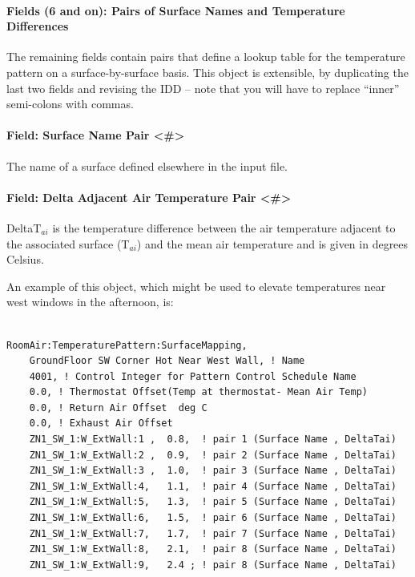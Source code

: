 \paragraph{Fields (6 and on): Pairs of Surface Names and Temperature Differences}\label{fields-6-and-on-pairs-of-surface-names-and-temperature-differences}

The remaining fields contain pairs that define a lookup table for the temperature pattern on a surface-by-surface basis. This object is extensible, by duplicating the last two fields and revising the IDD -- note that you will have to replace ``inner'' semi-colons with commas.

\paragraph{Field: Surface Name Pair \textless{}\#\textgreater{}}\label{field-surface-name-pair}

The name of a surface defined elsewhere in the input file.

\paragraph{Field: Delta Adjacent Air Temperature Pair \textless{}\#\textgreater{}}\label{field-delta-adjacent-air-temperature-pair}

DeltaT\(_{ai}\) is the temperature difference between the air temperature adjacent to the associated surface (T\(_{ai}\)) and the mean air temperature and is given in degrees Celsius.

An example of this object, which might be used to elevate temperatures near west windows in the afternoon, is:

\begin{lstlisting}

RoomAir:TemperaturePattern:SurfaceMapping,
    GroundFloor SW Corner Hot Near West Wall, ! Name
    4001, ! Control Integer for Pattern Control Schedule Name
    0.0, ! Thermostat Offset(Temp at thermostat- Mean Air Temp)
    0.0, ! Return Air Offset  deg C
    0.0, ! Exhaust Air Offset
    ZN1_SW_1:W_ExtWall:1 ,  0.8,  ! pair 1 (Surface Name , DeltaTai)
    ZN1_SW_1:W_ExtWall:2 ,  0.9,  ! pair 2 (Surface Name , DeltaTai)
    ZN1_SW_1:W_ExtWall:3 ,  1.0,  ! pair 3 (Surface Name , DeltaTai)
    ZN1_SW_1:W_ExtWall:4,   1.1,  ! pair 4 (Surface Name , DeltaTai)
    ZN1_SW_1:W_ExtWall:5,   1.3,  ! pair 5 (Surface Name , DeltaTai)
    ZN1_SW_1:W_ExtWall:6,   1.5,  ! pair 6 (Surface Name , DeltaTai)
    ZN1_SW_1:W_ExtWall:7,   1.7,  ! pair 7 (Surface Name , DeltaTai)
    ZN1_SW_1:W_ExtWall:8,   2.1,  ! pair 8 (Surface Name , DeltaTai)
    ZN1_SW_1:W_ExtWall:9,   2.4 ; ! pair 8 (Surface Name , DeltaTai)
\end{lstlisting}


